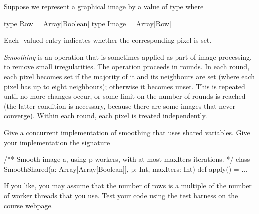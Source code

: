 \begin{question}
Suppose we represent a graphical image by a value of type  where 
\begin{scala}
  type Row = Array[Boolean]
  type Image = Array[Row]
\end{scala}
Each -valued entry indicates whether the corresponding pixel is
set.

\emph{Smoothing} is an operation that is sometimes applied as part of image
processing, to remove small irregularities.  The operation proceeds in rounds.
In each round, each pixel becomes set if the majority of it and its neighbours
are set (where each pixel has up to eight neighbours); otherwise it becomes
unset.  This is repeated until no more changes occur, or some limit on the
number of rounds is reached (the latter condition is necessary, because there
are some images that never converge).  Within each round, each pixel is
treated independently.

Give a concurrent implementation of smoothing that uses shared variables.
Give your implementation the signature
\begin{scala}
/** Smooth image a, using p workers, with at most maxIters iterations. */
class SmoothShared(a: Array[Array[Boolean]], p: Int, maxIters: Int){
  def apply() = ...
}
\end{scala}
If you like, you may assume that the number of rows is a multiple of the
number of worker threads that you use.  Test your code using the test harness
on the course webpage.
\end{question}


